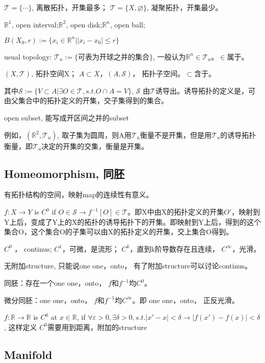 $\mathscr T = \{ \cdots \}$, 离散拓扑，开集最多；
$\mathscr T = \{ X, \varnothing \}$, 凝聚拓扑，开集最少。

$\mathbb{R}^1$, open interval;$\mathbb{R}^2$, open disk;$\mathbb{R}^n$, open ball;

$B(X_0, r) := \{ x_i \in \mathbb{R}^n |   |x_i - x_0| \leq r\}$

usual topology: $\mathscr T_u := \{ \mbox{可表为开球之并的集合}\}$, 一般认为$\mathbb{R}^n \in \mathscr T_u $。$\in$属于。

$(X, \mathscr T)$, 拓扑空间X；
$A \subset X， (A, \mathscr S)$， 拓扑子空间。$ \subset $含于。

其中$\mathscr S := \{  V \subset A | \exists O \in \mathscr T, s.t. O \cap A = V\}$, $\mathscr S$ 由$\mathscr T$诱导出。诱导拓扑的定义是，可由父集合中的拓扑定义的开集，交子集得到的集合。

open subset, 能写成开区间之并的subset 

例如，$(\mathbb R^2, \mathscr T_u)$, 取子集为圆周，则A用$\mathscr T_u$衡量不是开集，但是用$\mathscr T_u$的诱导拓扑衡量，即$\mathscr T_u$决定的开集的交集，衡量是开集。


\subsection{Homeomorphism, 同胚}

有拓扑结构的空间，映射map的连续性有意义。

$f:X \to Y$ is $C^0$ if $ O \in \mathscr S \rightarrow f^{-1}[O] \in \mathscr T$。即X中由X的拓扑定义的开集$O'$，映射到Y上后，变成了Y上的X的拓扑的诱导拓扑下的开集。即映射到Y上后，得到的这个集合O，这个集合O的子集可以由X的拓扑定义的开集，交上集合O得到。

$C^0$ ， continus; $C^1$，可微，是流形； $C^k$，直到k阶导数存在且连续， $C^\infty$，光滑。


无附加structure, 只能说one one，onto， 有了附加structure可以讨论continus。

同胚：存在一个one one，onto， $f$和$f^{-1}$均$C^0$。

微分同胚：one one，onto， $f$和$f^{-1}$均$C^\infty$。即 one one，onto， 正反光滑。

$f: \mathbb{R} \to \mathbb{R} $ is $C^0$ at $x\in  \mathbb{R}$, if $\forall \varepsilon >0, \exists \delta >0, s.t. |x' - x| < \delta \rightarrow |f(x') - f(x)| <   \delta$, 这样定义 $C^0$需要用到距离，附加的structure


\subsection{Manifold}

